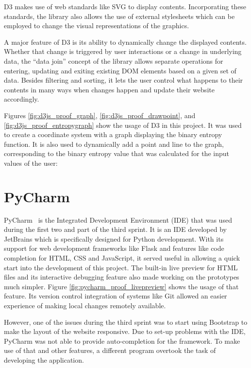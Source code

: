 D3 makes use of web standards like SVG to display contents. Incorporating these standards, the library also allows the use of external stylesheets which can be employed to change the visual representations of the graphics.

A major feature of D3 is its ability to dynamically change the displayed contents. Whether that change is triggered by user interactions or a change in underlying data, the ``data join'' concept of the library allows separate operations for entering, updating and exiting existing DOM elements based on a given set of data. Besides filtering and sorting, it lets the user control what happens to their contents in many ways when changes happen and update their website accordingly.

Figures \ref{fig:d3js_proof_graph}, \ref{fig:d3js_proof_drawpoint}, and \ref{fig:d3js_proof_entropygraph} show the usage of D3 in this project. It was used to create a coordinate system with a graph displaying the binary entropy function. It is also used to dynamically add a point and line to the graph, corresponding to the binary entropy value that was calculated for the input values of the user:
\pagebreak

\section{PyCharm} \label{pycharm}
PyCharm~\cite{pycharm} is the Integrated Development Environment (IDE) that was used during the first two and part of the third sprint. It is an IDE developed by JetBrains which is specifically designed for Python development. With its support for web development frameworks like Flask and features like code completion for HTML, CSS and JavaScript, it served useful in allowing a quick start into the development of this project.
The built-in live preview for HTML files and its interactive debugging feature also made working on the prototypes much simpler. Figure \ref{fig:pycharm_proof_livepreview} shows the usage of that feature.
Its version control integration of systems like Git allowed an easier experience of making local changes remotely available.

However, one of the issues during the third sprint was to start using Bootstrap to make the layout of the website responsive. Due to set-up problems with the IDE, PyCharm was not able to provide auto-completion for the framework. To make use of that and other features, a different program overtook the task of developing the application.

